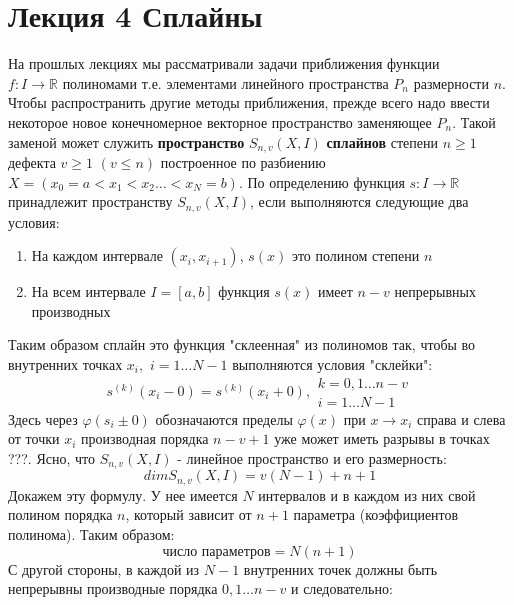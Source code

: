 \section{Лекция 4 Сплайны}

На прошлых лекциях мы рассматривали задачи приближения функции \\
$f:I \rightarrow\mathbb{R}$ полиномами т.е. элементами линейного пространства $P_n$ размерности $n$. Чтобы распространить другие методы приближения, прежде всего надо ввести некоторое новое конечномерное векторное пространство заменяющее $P_n$. Такой заменой может служить \textbf{ пространство} $S_{n,v}(X,I)$ \textbf{сплайнов} степени $n\geq 1$ дефекта $v\geq 1$ $(v\leq n)$ построенное по разбиению $X = (x_0=a < x_1 < x_2\ldots < x_N=b)$. 
По определению функция $s:I\rightarrow \mathbb{R}$ принадлежит пространству $S_{n,v}(X,I)$, если выполняются следующие два условия:
\begin{enumerate}
	\item На каждом интервале $(x_i,x_{i+1})$, $s(x)$ это полином степени $n$
	\item На всем интервале $I=[a,b]$ функция $s(x)$ имеет $n-v$ непрерывных производных
\end{enumerate}
Таким образом сплайн это функция "склеенная" из полиномов так, чтобы во внутренних точках $x_i,$ $ i = 1\ldots N-1$ выполняются условия "склейки":
\begin{equation}
s^{\left( k\right) }\left( x_{i}-0\right) =s^{\left( k\right) }\left( x_{i}+0\right),
\begin{aligned}k=0,1\ldots n-v\\ i=1\ldots N-1\end{aligned}
\end{equation}
Здесь через $\varphi(s_i\pm 0)$ обозначаются пределы $\varphi(x)$ при $x \rightarrow x_i$ справа и слева от точки $x_i$ производная порядка $n-v+1$ уже может иметь разрывы в точках ???.
Ясно, что $S_{n,v}(X,I)$ - линейное пространство и его размерность:
\begin{equation}
dim S_{n,v}(X,I) = v(N-1) +n+1
\end{equation}
Докажем эту формулу. У нее имеется $N$ интервалов и в каждом из них свой полином порядка $n$, который зависит от $n+1$ параметра (коэффициентов полинома). Таким образом:
\begin{equation}
\textit{число параметров} = N(n+1)
\end{equation} 
С другой стороны, в каждой из $N-1$ внутренних точек должны быть непрерывны производные порядка $0,1\ldots n-v$ и следовательно:
